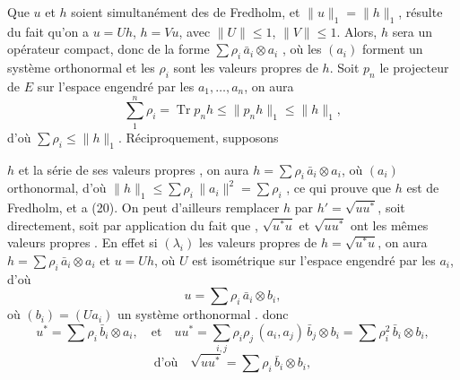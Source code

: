 \documentclass[11pt,a4paper]{article}
\begin{document}
Que $u$ et $h$ soient simultanément des  de Fredholm, et $\|u\|_1 = \|h\|_1$, résulte du fait qu'on a $u = Uh$, $h = Vu$, avec $\|U\| \leq 1$, $\|V\| \leq 1$. \struck{\ill{}} Alors, $h$ sera un opérateur compact,  donc  de la forme $\sum \rho_i\, \bar{a}_i \otimes a_i$ , où les $(a_i)$ forment un système orthonormal  et  les $\rho_i$ sont les valeurs propres de $h$. Soit $p_n$ le projecteur de $E$ sur l'espace engendré par les $a_1, \ldots, a_n$, on aura 
\[
  \sum_{1}^{n} \rho_i = \operatorname{Tr} p_n h \leq \|p_n h\|_1 \leq \|h\|_1,
\]
d'où $\sum \rho_i \leq \|h\|_1$. Réciproquement, supposons


$h$  et la série de ses valeurs propres  , on aura $h = \sum \rho_i\, \bar{a}_i \otimes a_i$, où $(a_i)$  orthonormal, d'où $\|h\|_1 \leq \sum \rho_i\, \|a_i\|^{2} = \sum \rho_i$ , ce qui prouve que $h$ est  de Fredholm, et  a (20). On peut d'ailleurs remplacer $h$ par $h' = \sqrt{uu^{*}}$, \struck{\ill{}} \ill{} soit directement, soit par application du fait  que \struck{\ill{}} \struck{\ill{}}  \ill{}    ,  $\sqrt{u^{*}u}$ et $\sqrt{uu^{*}}$ ont les mêmes valeurs propres . En effet si $(\lambda_i)$  les valeurs propres de $h = \sqrt{u^{*}u}$, on aura $h = \sum \rho_i\, \bar{a}_i \otimes a_i$ et $u = Uh$, où $U$ est isométrique sur l'espace engendré par les $a_i$, d'où
\[
  u = \sum \rho_i\, \bar{a}_i \otimes b_i,
\]
où $(b_i) = (Ua_i)$  un système orthonormal . \struck{\ill{}} donc
\[
  u^{*} = \sum \rho_i\, \bar{b}_i \otimes a_i, \quad \text{et}\quad uu^{*} = \sum_{i,j} \rho_i \rho_j\, (a_i, a_j)\, \bar{b}_j \otimes b_i = \sum \rho_i^{2}\, \bar{b}_i \otimes b_i,
\]
\[
  \text{d'où}\quad \sqrt{uu^{*}} = \sum \rho_i\, \bar{b}_i \otimes b_i,
\]
\end{document}
